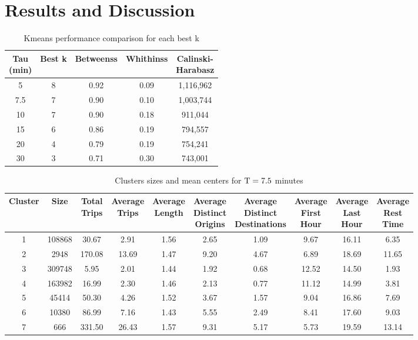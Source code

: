 \section{Results and Discussion}\label{s.results}


\begin{table}[ht]
\centering
\begin{tabular}{c c c c c}
  \hline
\thead{Tau\\(min)} & Best k & Betweenss & Whithinss & \thead{Calinski-\\Harabasz} \\
  \hline
5 &   8 & 0.92 & 0.09 & 1,116,962 \\
  7.5 &   7 & 0.90 & 0.10 & 1,003,744 \\
  10 &   7 & 0.90 & 0.18 &   911,044 \\
  15 &   6 & 0.86 & 0.19 &   794,557 \\
  20 &   4 & 0.79 & 0.19 &   754,241 \\
  30 &   3 & 0.71 & 0.30 &   743,001 \\
   \hline
\end{tabular}
\caption{Kmeans performance comparison for each best k }
\label{t:tau_comparison}
\end{table}


\begin{table*}[t]
\centering
\small
\begin{tabular}{c c c c c c c c c c}
  \hline
 Cluster &  Size & \thead{Total\\Trips} & \thead{Average\\Trips} & \thead{Average\\Length} & \thead{Average\\Distinct\\Origins} & \thead{Average\\Distinct\\Destinations} & \thead{Average\\First\\Hour} & \thead{Average\\Last\\Hour} & \thead{Average\\Rest\\Time} \\
  \hline
  1 & 108868 & 30.67 & 2.91 & 1.56 & 2.65 & 1.09 & 9.67 & 16.11 & 6.35 \\
  2 & 2948 & 170.08 & 13.69 & 1.47 & 9.20 & 4.67 & 6.89 & 18.69 & 11.65 \\
  3 & 309748 & 5.95 & 2.01 & 1.44 & 1.92 & 0.68 & 12.52 & 14.50 & 1.93 \\
  4 & 163982 & 16.99 & 2.30 & 1.46 & 2.13 & 0.77 & 11.12 & 14.99 & 3.81 \\
  5 & 45414 & 50.30 & 4.26 & 1.52 & 3.67 & 1.57 & 9.04 & 16.86 & 7.69 \\
  6 & 10380 & 86.99 & 7.16 & 1.43 & 5.55 & 2.49 & 8.41 & 17.60 & 9.03 \\
  7 & 666 & 331.50 & 26.43 & 1.57 & 9.31 & 5.17 & 5.73 & 19.59 & 13.14 \\
   \hline
\end{tabular}
\caption{Clusters sizes and mean centers for $\mathrm{T} = 7.5$ minutes}
\label{t:kmeans_centers_450}
\end{table*}
